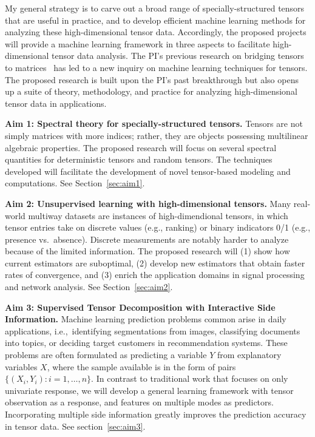 \documentclass[10pt]{article}
\theoremstyle{definition}
\theoremstyle{definition}
\theoremstyle{definition}
\begin{document}
My general strategy is to carve out a broad range of specially-structured tensors that are useful in practice, and to develop efficient machine learning methods for analyzing these high-dimensional tensor data. Accordingly, the proposed projects will provide a machine learning framework in three aspects to facilitate high-dimensional tensor data analysis. The PI’s previous research on bridging tensors to matrices~\cite{wang2017operator,zeng2019multiway,wang2018learning,wang2017tensor,wang2019three,lee2020tensor} has led to a new inquiry on machine learning techniques for tensors. The proposed research is built upon the PI's past breakthrough but also opens up a suite of theory, methodology, and practice for analyzing high-dimensional tensor data in applications. 

{\bf Aim 1: Spectral theory for specially-structured tensors.} Tensors are not simply matrices with more indices; rather, they are objects possessing multilinear algebraic properties. The proposed research will focus on several spectral quantities for deterministic tensors and random tensors. The techniques developed will facilitate the development of novel tensor-based modeling and computations. See Section~\ref{sec:aim1}.

{\bf Aim 2: Unsupervised learning with high-dimensional tensors.} Many real-world multiway datasets are instances of high-dimendional tensors, in which tensor entries take on discrete values (e.g., ranking) or binary indicators 0/1 (e.g., presence vs.\ absence). Discrete measurements are notably harder to analyze because of the limited information. The proposed research will (1) show how current estimators are suboptimal, (2) develop new estimators that obtain faster rates of convergence, and (3) enrich the application domains in signal processing and network analysis. See Section~\ref{sec:aim2}.

{\bf Aim 3: Supervised Tensor Decomposition with Interactive Side Information.} Machine learning prediction problems common arise in daily applications, i.e.,\ identifying segmentations from images, classifying documents into topics, or deciding target customers in recommendation systems. These problems are often formulated as predicting a variable $Y$ from explanatory variables $X$, where the sample available is in the form of pairs $\{(X_i, Y_i): i=1,\ldots,n\}$. In contrast to traditional work that focuses on only univariate response, we will develop a general learning framework with tensor observation as a response, and features on multiple modes as predictors. Incorporating multiple side information greatly improves the prediction accuracy in tensor data. See section~\ref{sec:aim3}.
\end{document}
